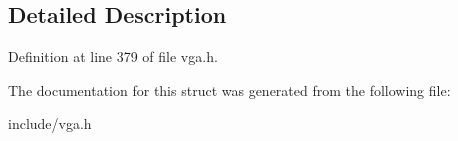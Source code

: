 \subsection{Detailed Description}


Definition at line 379 of file vga.\-h.



The documentation for this struct was generated from the following file\-:\begin{DoxyCompactItemize}
\item 
include/vga.\-h\end{DoxyCompactItemize}
